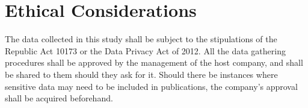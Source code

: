 \documentclass[12pt]{report}
\begin{document}
\section{Ethical Considerations}

The data collected in this study shall be subject to the stipulations of the Republic Act 10173 or the Data Privacy Act of 2012.
All the data gathering procedures shall be approved by the management of the host company, and shall be shared to them should they ask for it.
Should there be instances where sensitive data may need to be included in publications, the company's approval shall be acquired beforehand.


\printbibliography[
    title = {REFERENCES},
    heading = bibintoc
]

\setlength{\parindent}{0mm}
\end{document}
